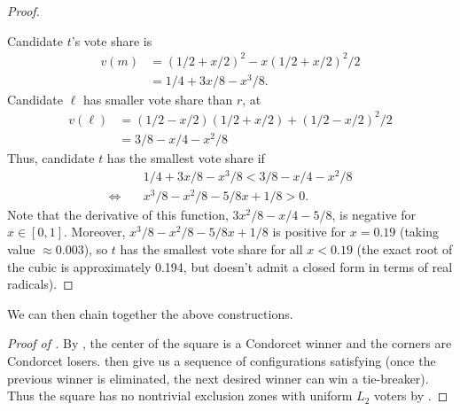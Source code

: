 \documentclass{article}
\theoremstyle{theorem}
\theoremstyle{definition}
\begin{document}
\begin{proof}
\begin{center}
\end{center}
Candidate $t$'s vote share is
\begin{align*}
  v(m) &= (1/2 + x/2)^2 - x(1/2 + x/2)^2/2\\
  &= 1/4 + 3 x/8 - x^3/8.
\end{align*}
Candidate $\ell$ has smaller vote share than $r$, at
\begin{align*}
 v(\ell) &= (1/2 - x/2)(1/2 + x/2) + (1/2 - x/2)^2/2\\
 &= 3/8 - x/4 - x^2/8
\end{align*}
Thus, candidate $t$ has the smallest vote share if
\begin{align*}
  &1/4 + 3 x/8 - x^3/8 < 3/8 - x/4 - x^2/8\\
  \Leftrightarrow \quad & x^3/8 - x^2 /8 - 5/8x +1/8 > 0.
\end{align*}
Note that the derivative of this function, $3x^2/8 - x/4 - 5/8$, is negative for $x \in [0, 1]$. Moreover, $x^3/8 - x^2 /8 - 5/8x +1/8$ is positive for $x = 0.19$ (taking value $\approx 0.003$), so $t$ has the smallest vote share for all $x < 0.19$ (the exact root of the cubic is approximately 0.194, but doesn't admit a closed form in terms of real radicals).
\end{proof}


We can then chain together the above constructions.
\begin{proof}[Proof of ]
By , the center of the square is a Condorcet winner and the corners are Condorcet losers.  then give us a sequence of configurations satisfying  (once the previous winner is eliminated, the next desired winner can win a tie-breaker). Thus the square has no nontrivial exclusion zones with uniform $L_2$ voters by . 
\end{proof}
\end{document}
